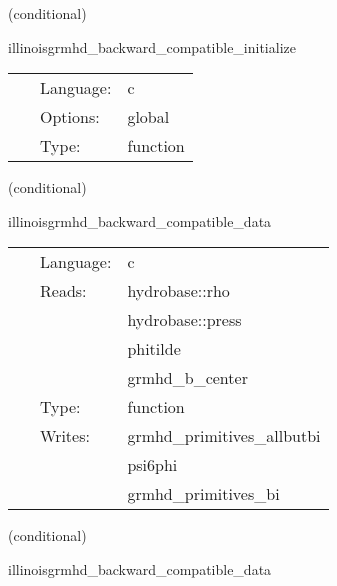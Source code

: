 \vspace{5mm}

   (conditional) 

\hspace{5mm} illinoisgrmhd\_backward\_compatible\_initialize 

\hspace{5mm}{\it set up the grhayl structs and read the table for tabulated eos. } 


\hspace{5mm}

 \begin{tabular*}{160mm}{cll} 
~ & Language:  & c \\ 
~ & Options:  & global \\ 
~ & Type:  & function \\ 
\end{tabular*} 


\vspace{5mm}

   (conditional) 

\hspace{5mm} illinoisgrmhd\_backward\_compatible\_data 

\hspace{5mm}{\it copy data to deprecated variables } 


\hspace{5mm}

 \begin{tabular*}{160mm}{cll} 
~ & Language:  & c \\ 
~ & Reads:  & hydrobase::rho \\ 
~& ~ &hydrobase::press\\ 
~& ~ &phitilde\\ 
~& ~ &grmhd\_b\_center\\ 
~ & Type:  & function \\ 
~ & Writes:  & grmhd\_primitives\_allbutbi \\ 
~& ~ &psi6phi\\ 
~& ~ &grmhd\_primitives\_bi\\ 
\end{tabular*} 


\vspace{5mm}

   (conditional) 

\hspace{5mm} illinoisgrmhd\_backward\_compatible\_data 

\hspace{5mm}{\it copy data to deprecated variables } 


